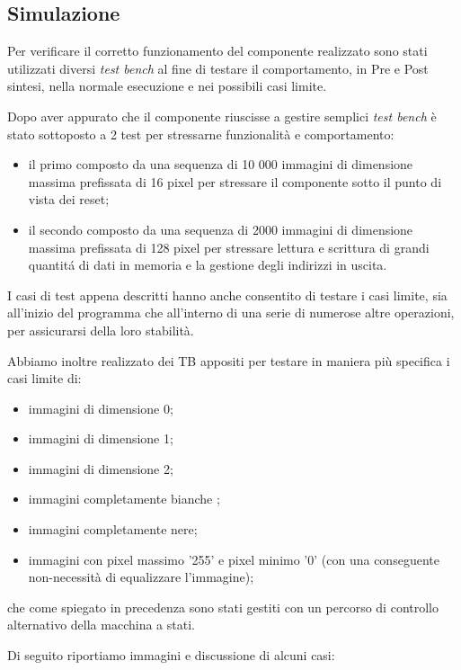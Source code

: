 \clearpage

\subsection{Simulazione}
Per verificare il corretto funzionamento del componente realizzato sono stati utilizzati diversi \textit{test bench} al fine di testare il comportamento, in Pre e Post sintesi, nella normale esecuzione e nei possibili casi limite.

Dopo aver appurato che il componente riuscisse a gestire semplici \textit{test bench} è stato sottoposto a 2 test per stressarne funzionalità e comportamento: 
\begin{itemize}
    \item il primo composto da una sequenza di 10 000 immagini di dimensione massima prefissata di 16 pixel per stressare il componente sotto il punto di vista dei reset;
    \item il secondo composto da una sequenza di 2000 immagini di dimensione massima prefissata di 128 pixel per stressare lettura e scrittura di grandi quantitá di dati in memoria e la gestione degli indirizzi in uscita.
\end{itemize}

I casi di test appena descritti hanno anche consentito di testare i casi limite, sia all'inizio del programma che all'interno di una serie di numerose altre operazioni, per assicurarsi della loro stabilità.

Abbiamo inoltre realizzato dei TB appositi per testare in maniera più specifica i casi limite di:
\begin{itemize}
    \item immagini di dimensione 0;
    \item immagini di dimensione 1;
    \item immagini di dimensione 2;
    \item immagini completamente bianche ;
    \item immagini completamente nere;
    \item immagini con pixel massimo '255' e pixel minimo '0' (con una conseguente non-necessità di equalizzare l'immagine);
\end{itemize}
che come spiegato in precedenza sono stati gestiti con un percorso di controllo alternativo della macchina a stati.

Di seguito riportiamo immagini e discussione di alcuni casi:
